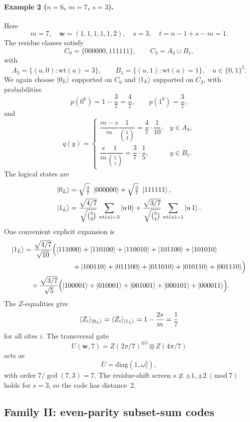 \documentclass[pdflatex,sn-nature]{sn-jnl}%
\theoremstyle{thmstyleone}%
\theoremstyle{thmstyletwo}%
\theoremstyle{thmstylethree}%
\begin{document}
\begin{appendices}
\paragraph{Example 2 ($n=6$, $m=7$, $s=3$).}
Here
\[
  m=7,\quad \mathbf w=(1,1,1,1,1,2),\quad s=3,\quad t=n-1+s-m=1.
\]
The residue classes satisfy
\[
  C_0=\{000000,111111\},\qquad C_3=A_3\cup B_1,
\]
with
\[
  A_3=\{(u,0):\mathrm{wt}(u)=3\},\qquad
  B_1=\{(u,1):\mathrm{wt}(u)=1\},\quad u\in\{0,1\}^{5}.
\]
We again choose $\ket{0_L}$ supported on $C_0$ and $\ket{1_L}$ supported on $C_3$, with probabilities
\[
  p(0^6)=1-\frac{3}{7}=\frac{4}{7},\qquad
  p(1^6)=\frac{3}{7},
\]
and
\[
  q(y)=
  \begin{cases}
    \dfrac{m-s}{m}\dfrac{1}{\binom{5}{3}}=\dfrac{4}{7}\cdot\dfrac{1}{10}, & y\in A_3,\\[4pt]
    \dfrac{s}{m}\dfrac{1}{\binom{5}{1}}=\dfrac{3}{7}\cdot\dfrac{1}{5},   & y\in B_1.
  \end{cases}
\]
The logical states are
\begin{align}
  \ket{0_L}
    &=\sqrt{\tfrac{4}{7}}\ \ket{000000}
      +\sqrt{\tfrac{3}{7}}\ \ket{111111}, \notag\\
  \ket{1_L}
    &=\frac{\sqrt{4/7}}{\sqrt{\binom{5}{3}}}
      \sum_{\mathrm{wt}(u)=3} \ket{u\,0}
     +\frac{\sqrt{3/7}}{\sqrt{\binom{5}{1}}}
      \sum_{\mathrm{wt}(u)=1} \ket{u\,1}. \notag
\end{align}
One convenient explicit expansion is
\begin{align*}
    \ket{1_L}
     & =\frac{\sqrt{4/7}}{\sqrt{10}}\Bigl(
       \ket{111000}+\ket{110100}+\ket{110010}+\ket{101100}+\ket{101010} \\
     & \qquad\qquad\qquad\quad +\ket{100110}+\ket{011100}+\ket{011010}
                               +\ket{010110}+\ket{001110}\Bigr)         \\
     & \quad+\frac{\sqrt{3/7}}{\sqrt{5}}\Bigl(
       \ket{100001}+\ket{010001}+\ket{001001}+\ket{000101}+\ket{000011}
       \Bigr).
\end{align*}
The $Z$-equalities give
\[
  \langle Z_i\rangle_{\ket{0_L}}=\langle Z_i\rangle_{\ket{1_L}}
  =1-\frac{2s}{m}=\frac{1}{7}
\]
for all sites $i$. The transversal gate
\[
  U(\mathbf w,7)
    =Z(2\pi/7)^{\otimes 5}\otimes Z(4\pi/7)
\]
acts as
\[
  \overline U=\mathrm{diag}(1,\omega_7^{3}),
\]
with order $7/\gcd(7,3)=7$. The residue-shift screen
$s\not\equiv \pm1,\pm2\ (\mathrm{mod}\ 7)$ holds for $s=3$, so the code has distance~2.

\subsection{Family II: even-parity subset-sum codes}
\label{subsubsec:supp:family2}


\end{appendices}
\end{document}
